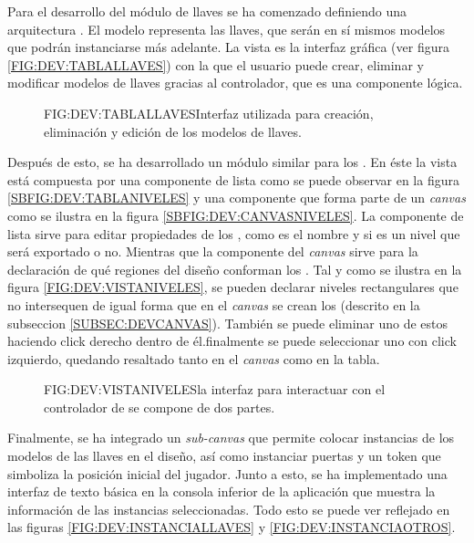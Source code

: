 Para el desarrollo del módulo de llaves se ha comenzado definiendo una arquitectura . El modelo representa las llaves, que serán en sí mismos modelos que podrán instanciarse más adelante. La vista es la interfaz gráfica (ver figura \ref{FIG:DEV:TABLALLAVES}) con la que el usuario puede crear, eliminar y modificar modelos de llaves gracias al controlador, que es una componente lógica.

\begin{figure}{FIG:DEV:TABLALLAVES}{Interfaz utilizada para creación, eliminación y edición de los modelos de llaves.}
\end{figure}

Después de esto, se ha desarrollado un módulo similar para los . En éste la vista está compuesta por una componente de lista como se puede observar en la figura \ref{SBFIG:DEV:TABLANIVELES} y una componente que forma parte de un \textit{canvas} como se ilustra en la figura \ref{SBFIG:DEV:CANVASNIVELES}.
La componente de lista sirve para editar propiedades de los , como es el nombre y si es un nivel que será exportado o no. Mientras que la componente del \textit{canvas} sirve para la declaración de qué regiones del diseño conforman los .
Tal y como se ilustra en la figura \ref{FIG:DEV:VISTANIVELES}, se pueden declarar niveles rectangulares que no intersequen de igual forma que en el \textit{canvas} se crean los  (descrito en la subseccion \ref{SUBSEC:DEVCANVAS}). También se puede eliminar uno de estos  haciendo click derecho dentro de él.finalmente se puede seleccionar uno con click izquierdo, quedando resaltado tanto en el \textit{canvas} como en la tabla.

\begin{figure}{FIG:DEV:VISTANIVELES}{la interfaz para interactuar con el controlador de  se compone de dos partes.}
	 \quad
\end{figure}

Finalmente, se ha integrado un \textit{sub-canvas} que permite colocar instancias de los modelos de las llaves en el diseño, así como instanciar puertas y un token que simboliza la posición inicial del jugador. Junto a esto, se ha implementado una interfaz de texto básica en la consola inferior de la aplicación que muestra la información de las instancias seleccionadas.
Todo esto se puede ver reflejado en las figuras \ref{FIG:DEV:INSTANCIALLAVES} y \ref{FIG:DEV:INSTANCIAOTROS}.

